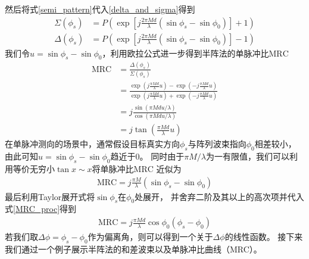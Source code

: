 \documentclass[master]{thesis-uestc}
\begin{document}
然后将式\eqref{semi_pattern}代入\eqref{delta_and_sigma}得到
\begin{subequations}
    \begin{align}
        \Sigma(\phi_s) &= P\left(
                            \exp\left[
                                   j\frac{2\pi Md}{\lambda}(\sin\phi_s-\sin\phi_0)
                                \right] + 1
                           \right)
                       \\
       \Delta(\phi_s) &= P\left(
                            \exp\left[
                                   j\frac{2\pi Md}{\lambda}(\sin\phi_s-\sin\phi_0)
                                \right] - 1
                           \right)
    \end{align}
\end{subequations}
我们令$u=\sin\phi_s-\sin\phi_0$，利用欧拉公式进一步得到半阵法的单脉冲比$\text{MRC}$
\begin{equation}\label{semi_MRC}
    \begin{aligned}
    \text{MRC} &= \frac{\Delta(\phi_s)}{\Sigma(\phi_s)}
    \\
               &= \frac{\exp\left(j\frac{\pi Md}{\lambda}u\right) -
                        \exp\left(-j\frac{\pi Md}{\lambda}u\right)}
                       {\exp\left(j\frac{\pi Md}{\lambda}u\right) +
                        \exp\left(-j\frac{\pi Md}{\lambda}u\right)}
    \\
               &= j\frac{\sin\left(\pi Mdu/\lambda\right)}{\cos\left(\pi Md u/\lambda\right)}
   \\
               &= j\tan\left(\frac{\pi Md}{\lambda}u\right)          
    \end{aligned}
\end{equation}
在单脉冲测向的场景中，通常假设目标真实方向$\phi_s$与阵列波束指向$\phi_0$相差较小，
由此可知$u=\sin\phi_s-\sin\phi_0$趋近于$0$。
同时由于$\pi M/\lambda$为一有限值，我们可以利用等价无穷小$\tan x \sim x$将单脉冲比$\text{MRC}$
近似为
\begin{equation}\label{MRC_proc}
    \begin{aligned}
    \text{MRC} = j\frac{\pi M}{\lambda}\left(\sin\phi_s-\sin\phi_0\right)
    \end{aligned}
\end{equation}
最后利用Taylor展开式将$\sin\phi_s$在$\phi_0$处展开，
并舍弃二阶及其以上的高次项并代入式\eqref{MRC_proc}得到
\begin{equation}\label{semi_MRC_fin}
    \begin{aligned}
        \text{MRC} = j\frac{\pi Md}{\lambda}\cos\phi_0\left(\phi_s-\phi_0\right)
    \end{aligned}
\end{equation}
若我们取$\Delta\phi=\phi_s-\phi_0$作为偏离角，则可以得到一个关于$\Delta\phi$的线性函数。
接下来我们通过一个例子展示半阵法的和差波束以及单脉冲比曲线（MRC）。
\end{document}
